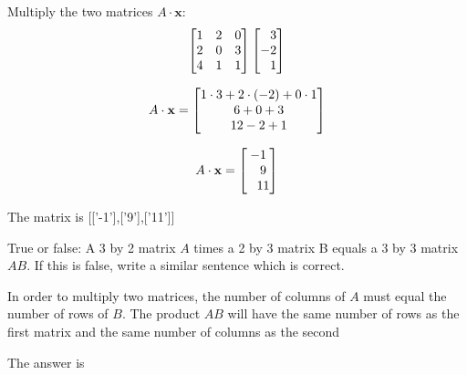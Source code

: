 \documentclass{ximera}
\begin{document}
\begin{question}
Multiply the two matrices $A \cdot \mathbf{x}$:
\[\begin{bmatrix} 1&2&0\\2&0&3\\4&1&1 \end{bmatrix} \begin{bmatrix}\phantom{-}3\\-2\\\phantom{-}1\end{bmatrix}\]

\begin{solution}
\begin{hint}
\[A \cdot \mathbf{x} = \begin{bmatrix}1\cdot3+2\cdot(-2)+0\cdot1\\6+0+3\\12-2+1\end{bmatrix}\]
\end{hint}

\begin{hint}
\[A \cdot \mathbf{x} = \begin{bmatrix}-1\\\phantom{-}9\\\phantom{-}11\end{bmatrix}\]
\end{hint}

 \begin{matrixAnswer}[name=M]
      The matrix is  [['-1'],['9'],['11']]
    \end{matrixAnswer}
\end{solution}
\end{question}

\begin{question}
True or false: A 3 by 2 matrix $A$ times a 2 by 3 matrix B equals a 3 by 3 matrix $AB$. 
If this is false, write a similar sentence which is correct.
\begin{solution}
\begin{hint}
In order to multiply two matrices, the number of columns of $A$ must equal the number of rows of $B$. The product $AB$ will have the same number of rows as the first matrix and the same number of columns as the second
\end{hint}
The answer is 
\end{solution}
\end{question}
\end{document}
